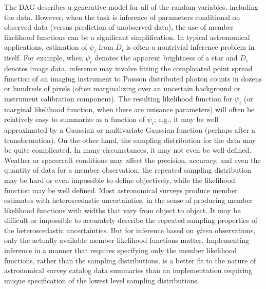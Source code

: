 The DAG describes a generative model for all of the random variables, including the data.
However, when the task is inference of parameters conditional on observed data (versus prediction of unobserved data), the use of member likelihood functions can be a significant simplification.
In typical astronomical applications, estimation of $\psi_i$ from $D_i$ is often a nontrivial inference problem in itself.
For example, when $\psi_i$ denotes the apparent brightness of a star and $D_i$ denotes image data, inference may involve fitting the complicated point spread function of an imaging instrument to Poisson distributed photon counts in dozens or hundreds of pixels (often marginalizing over an uncertain background or instrument calibration component).
The resulting likelihood function for $\psi_i$ (or marginal likelihood function, when there are nuisance parameters) will often be relatively easy to summarize as a function of $\psi_i$; e.g., it may be well approximated by a Gaussian or multivariate Gaussian function (perhaps after a transformation).
On the other hand, the sampling distribution for the data may be quite complicated.
In many circumstances, it may not even be well-defined.
Weather or spacecraft conditions may affect the precision, accuracy, and even the quantity of data for a member observation; the repeated sampling distribution may be hard or even impossible to define objectively, while the likelihood function may be well defined.
Most astronomical surveys produce member estimates with heteroscedastic uncertainties, in the sense of producing member likelihood functions with widths that vary from object to object.
It may be difficult or impossible to accurately describe the repeated sampling properties of the heteroscedastic uncertainties.
But for inference based on \emph{given} observations, only the actually available member likelihood functions matter.
Implementing inference in a manner that requires specifying only the member likelihood functions, rather than the sampling distributions, is a better fit to the nature of astronomical survey catalog data summaries than an implementation requiring unique specification of the lowest level sampling distributions.

